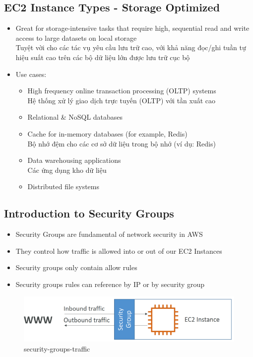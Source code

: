 \subsection{EC2 Instance Types - Storage Optimized}
\begin{itemize}
	\item Great for storage-intensive tasks that require high, sequential read and write access to large datasets on local storage \\
	Tuyệt vời cho các tác vụ yêu cầu lưu trữ cao, với khả năng đọc/ghi tuần tự hiệu suất cao trên các bộ dữ liệu lớn được lưu trữ cục bộ
	\item Use cases:
	\begin{itemize}
		\item High frequency online transaction processing (OLTP) systems \\ Hệ thống xử lý giao dịch trực tuyến (OLTP) với tần xuất cao
		\item Relational \& NoSQL databases
		\item Cache for in-memory databases (for example, Redis) \\Bộ nhớ đệm cho các cơ sở dữ liệu trong bộ nhớ (ví dụ: Redis)
		\item Data warehousing applications \\ Các ứng dụng kho dữ liệu
		\item Distributed file systems
	\end{itemize}
\end{itemize}


\subsection{Introduction to Security Groups}

\begin{itemize}
	\item Security Groups are fundamental of network security in AWS
	\item They control how traffic is allowed into or out of our EC2 Instances 
	\item Security groups only contain allow rules
	\item Security groups rules can reference by IP or by security group
\end{itemize}


\begin{figure}[htbp]
	\centering
	\includegraphics[width=1\linewidth]{images/security-groups-traffic.png}
	\caption{security-groups-traffic}
	\label{fig:security-groups-traffic}
\end{figure}

